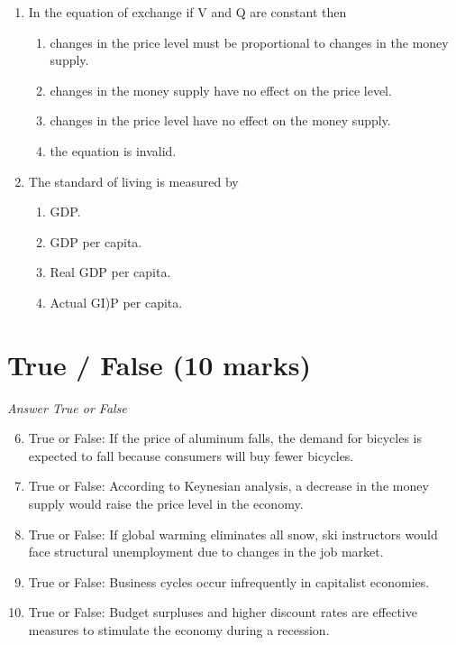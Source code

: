 \documentclass[12pt]{article}
\begin{document}
\begin{enumerate}[label=\arabic*.]
\begin{enumerate}[label=(\alph*)]
    \item GDP increases and the price level increases.
\end{enumerate}
\item In the equation of exchange if V and Q are constant then
\begin{enumerate}[label=(\alph*)]
    \item changes in the price level must be proportional to changes in the money supply.
    \item changes in the money supply have no effect on the price level.
    \item changes in the price level have no effect on the money supply.
    \item the equation is invalid.
\end{enumerate}
\item The standard of living is measured by
\begin{enumerate}[label=(\alph*)]
    \item GDP.
    \item GDP per capita.
    \item Real GDP per capita.
    \item Actual GI)P per capita.
\end{enumerate}
\end{enumerate}

\section*{True / False (10 marks)}
\textit{Answer True or False}
\begin{enumerate}[label=\arabic*.]
\setcounter{enumi}{5}
\item True or False: If the price of aluminum falls, the demand for bicycles is expected to fall because consumers will buy fewer bicycles.
\item True or False: According to Keynesian analysis, a decrease in the money supply would raise the price level in the economy.
\item True or False: If global warming eliminates all snow, ski instructors would face structural unemployment due to changes in the job market.
\item True or False: Business cycles occur infrequently in capitalist economies.
\item True or False: Budget surpluses and higher discount rates are effective measures to stimulate the economy during a recession.
\end{enumerate}
\end{document}
